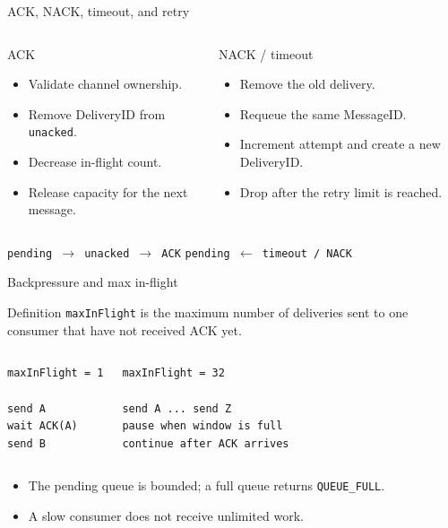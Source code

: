 \documentclass[aspectratio=169,10pt]{beamer}
\newcommand{\code}[1]{\texttt{\small #1}}
\begin{document}
\begin{frame}{ACK, NACK, timeout, and retry}
  \begin{columns}[T,onlytextwidth]
      \begin{block}{ACK}
        \begin{itemize}
          \item Validate channel ownership.
          \item Remove DeliveryID from \code{unacked}.
          \item Decrease in-flight count.
          \item Release capacity for the next message.
        \end{itemize}
      \end{block}
      \begin{block}{NACK / timeout}
        \begin{itemize}
          \item Remove the old delivery.
          \item Requeue the same MessageID.
          \item Increment attempt and create a new DeliveryID.
          \item Drop after the retry limit is reached.
        \end{itemize}
      \end{block}
  \end{columns}
  \vspace{.45em}
  \begin{center}
    \code{pending $\rightarrow$ unacked $\rightarrow$ ACK} \qquad
    \code{pending $\leftarrow$ timeout / NACK}
  \end{center}
\end{frame}

\begin{frame}[fragile]{Backpressure and max in-flight}
  \begin{block}{Definition}
    \code{maxInFlight} is the maximum number of deliveries sent to one
    consumer that have not received ACK yet.
  \end{block}
  \begin{columns}[T,onlytextwidth]
      \begin{lstlisting}[style=wire]
maxInFlight = 1

send A
wait ACK(A)
send B
      \end{lstlisting}
      \begin{lstlisting}[style=wire]
maxInFlight = 32

send A ... send Z
pause when window is full
continue after ACK arrives
      \end{lstlisting}
  \end{columns}
  \vspace{.3em}
  \begin{itemize}
    \item The pending queue is bounded; a full queue returns \code{QUEUE\_FULL}.
    \item A slow consumer does not receive unlimited work.
  \end{itemize}
\end{frame}
\end{document}
